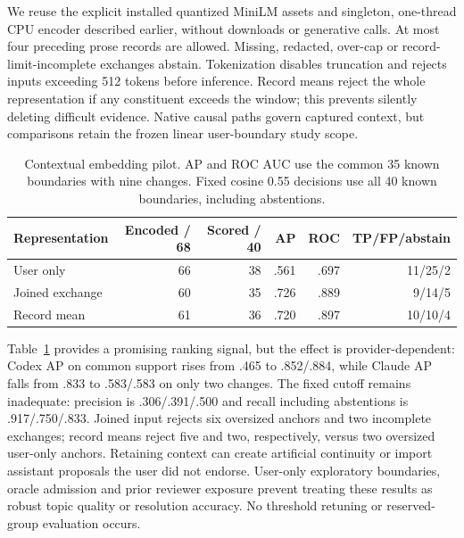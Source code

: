 \documentclass[11pt]{article}
\begin{document}
We reuse the explicit installed quantized MiniLM assets and singleton,
one-thread CPU encoder described earlier, without downloads or generative calls.
At most four preceding prose records are allowed. Missing, redacted, over-cap
or record-limit-incomplete exchanges abstain. Tokenization disables truncation
and rejects inputs exceeding 512 tokens before inference. Record means reject
the whole representation if any constituent exceeds the window; this prevents
silently deleting difficult evidence. Native causal paths govern captured
context, but comparisons retain the frozen linear user-boundary study scope.

\begin{table}[ht]
\centering
\begin{tabular}{lrrrrr}
\hline
Representation & Encoded / 68 & Scored / 40 & AP & ROC & TP/FP/abstain \\
\hline
User only & 66 & 38 & .561 & .697 & 11/25/2 \\
Joined exchange & 60 & 35 & .726 & .889 & 9/14/5 \\
Record mean & 61 & 36 & .720 & .897 & 10/10/4 \\
\hline
\end{tabular}
\caption{Contextual embedding pilot. AP and ROC AUC use the common 35 known
boundaries with nine changes. Fixed cosine 0.55 decisions use all 40 known
boundaries, including abstentions.}
\label{tab:context-embeddings}
\end{table}

Table~\ref{tab:context-embeddings} provides a promising ranking signal, but the
effect is provider-dependent: Codex AP on common support rises from .465 to
.852/.884, while Claude AP falls from .833 to .583/.583 on only two changes.
The fixed cutoff remains inadequate: precision is .306/.391/.500 and recall
including abstentions is .917/.750/.833. Joined input rejects six oversized
anchors and two incomplete exchanges; record means reject five and two,
respectively, versus two oversized user-only anchors. Retaining context can
create artificial continuity or import assistant proposals the user did not
endorse. User-only exploratory boundaries, oracle admission and prior reviewer
exposure prevent treating these results as robust topic quality or resolution
accuracy. No threshold retuning or reserved-group evaluation occurs.
\end{document}
